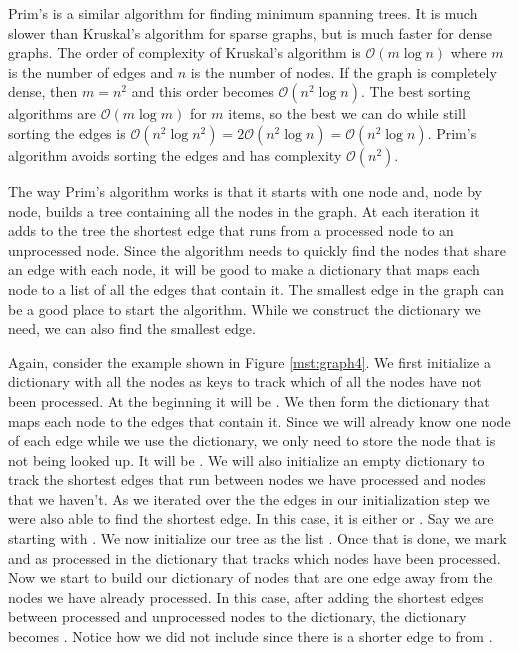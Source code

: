 Prim's is a similar algorithm for finding minimum spanning trees.
It  is much slower than Kruskal's algorithm for sparse graphs, but is much faster for dense graphs.
The order of complexity of Kruskal's algorithm is $\mathcal{O}\left( m \log{n} \right)$ where $m$ is the number of edges and $n$ is the number of nodes.
If the graph is completely dense, then $m=n^2$ and this order becomes $\mathcal{O}\left( n^2 \log{n}\right)$.
The best sorting algorithms are $\mathcal{O}\left( m \log{m}\right)$ for $m$ items, so the best we can do while still sorting the edges is $\mathcal{O}\left( n^2 \log{n^2}\right) = 2 \mathcal{O}\left( n^2 \log{n}\right) = \mathcal{O}\left( n^2 \log{n} \right)$.
Prim's algorithm avoids sorting the edges and has complexity $\mathcal{O} \left( n^2 \right)$.

The way Prim's algorithm works is that it starts with one node and, node by node, builds a tree containing all the nodes in the graph.
At each iteration it adds to the tree the shortest edge that runs from a processed node to an unprocessed node.
Since the algorithm needs to quickly find the nodes that share an edge with each node, it will be good to make a dictionary that maps each node to a list of all the edges that contain it.
The smallest edge in the graph can be a good place to start the algorithm.
While we construct the dictionary we need, we can also find the smallest edge.

Again, consider the example shown in Figure \ref{mst:graph4}.
We first initialize a dictionary with all the nodes as keys to track which of all the nodes have not been processed.
At the beginning it will be .
We then form the dictionary that maps each node to the edges that contain it.
Since we will already know one node of each edge while we use the dictionary, we only need to store the node that is not being looked up.
It will be .
We will also initialize an empty dictionary to track the shortest edges that run between nodes we have processed and nodes that we haven't.
As we iterated over the the edges in our initialization step we were also able to find the shortest edge.
In this case, it is either  or .
Say we are starting with .
We now initialize our tree as the list \li{[(D, C, 1)]}.
Once that is done, we mark  and  as processed in the dictionary that tracks which nodes have been processed.
Now we start to build our dictionary of nodes that are one edge away from the nodes we have already processed.
In this case, after adding the shortest edges between processed and unprocessed nodes to the dictionary, the dictionary becomes .
Notice how we did not include  since there is a shorter edge to  from .

